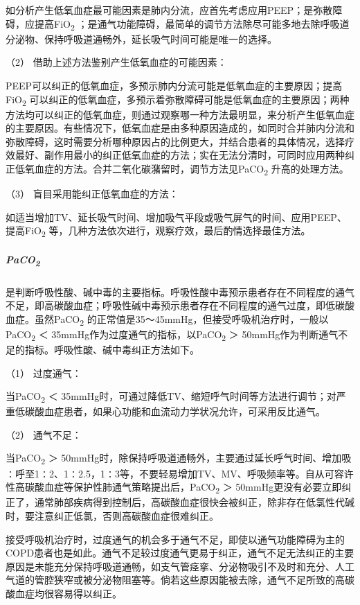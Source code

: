 如分析产生低氧血症最可能因素是肺内分流，应首先考虑应用PEEP；是弥散障碍，应提高FiO\textsubscript{2}
；是通气功能障碍，最简单的调节方法除尽可能多地去除呼吸道分泌物、保持呼吸道通畅外，延长吸气时间可能是唯一的选择。

\hypertarget{text00370.htmlux5cux23CHP16-3-4-2-1-1-2}{}
（2） 借助上述方法鉴别产生低氧血症的可能因素：

PEEP可以纠正的低氧血症，多预示肺内分流可能是低氧血症的主要原因；提高FiO\textsubscript{2}
可以纠正的低氧血症，多预示着弥散障碍可能是低氧血症的主要原因；两种方法均可以纠正的低氧血症，则通过观察哪一种方法最明显，来分析产生低氧血症的主要原因。有些情况下，低氧血症是由多种原因造成的，如同时合并肺内分流和弥散障碍，这时需要分析哪种原因占的比例更大，并结合患者的具体情况，选择疗效最好、副作用最小的纠正低氧血症的方法；实在无法分清时，可同时应用两种纠正低氧血症的方法。合并二氧化碳潴留时，调节方法见PaCO\textsubscript{2}
升高的处理方法。

\hypertarget{text00370.htmlux5cux23CHP16-3-4-2-1-1-3}{}
（3） 盲目采用能纠正低氧血症的方法：

如适当增加TV、延长吸气时间、增加吸气平段或吸气屏气的时间、应用PEEP、提高FiO\textsubscript{2}
等，几种方法依次进行，观察疗效，最后酌情选择最佳方法。

\subparagraph{PaCO\textsubscript{2}}

是判断呼吸性酸、碱中毒的主要指标。呼吸性酸中毒预示患者存在不同程度的通气不足，即高碳酸血症；呼吸性碱中毒预示患者存在不同程度的通气过度，即低碳酸血症。虽然PaCO\textsubscript{2}
的正常值是35～45mmHg，但接受呼吸机治疗时，一般以PaCO\textsubscript{2} ＜
35mmHg作为过度通气的指标，以PaCO\textsubscript{2} ＞
50mmHg作为判断通气不足的指标。呼吸性酸、碱中毒纠正方法如下。

\hypertarget{text00370.htmlux5cux23CHP16-3-4-2-1-2-1}{}
（1） 过度通气：

当PaCO\textsubscript{2} ＜
35mmHg时，可通过降低TV、缩短呼气时间等方法进行调节；对严重低碳酸血症患者，如果心功能和血流动力学状况允许，可采用反比通气。

\hypertarget{text00370.htmlux5cux23CHP16-3-4-2-1-2-2}{}
（2） 通气不足：

当PaCO\textsubscript{2} ＞
50mmHg时，除保持呼吸道通畅外，主要通过延长呼气时间、增加吸∶呼至1∶2、1∶2.5，1∶3等，不要轻易增加TV、MV、呼吸频率等。自从可容许性高碳酸血症等保护性肺通气策略提出后，PaCO\textsubscript{2}
＞
50mmHg更没有必要立即纠正了，通常肺部疾病得到控制后，高碳酸血症很快会被纠正，除非存在低氯性代碱时，要注意纠正低氯，否则高碳酸血症很难纠正。

接受呼吸机治疗时，过度通气的机会多于通气不足，即使以通气功能障碍为主的COPD患者也是如此。通气不足较过度通气更易于纠正，通气不足无法纠正的主要原因是未能充分保持呼吸道通畅，如支气管痉挛、分泌物吸引不及时和充分、人工气道的管腔狭窄或被分泌物阻塞等。倘若这些原因能被去除，通气不足所致的高碳酸血症均很容易得以纠正。

